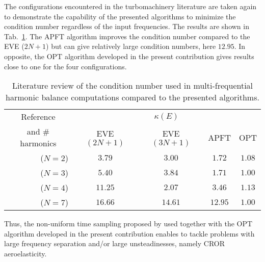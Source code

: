 The configurations encountered in the turbomachinery literature 
are taken again to demonstrate the capability of the presented
algorithms to minimize the condition number
regardless of the input frequencies. The results are shown in 
Tab.~\ref{tab:literature_multistage2}.
The APFT algorithm improves the condition number compared to the
EVE ($2N+1$) but can give relatively large condition numbers, here $12.95$. 
In opposite, the OPT algorithm developed in the
present contribution gives results close to one for the four configurations.
\begin{table}[htp]
   \centering
  \begin{tabular}{rcccc}
    \toprule
    \multicolumn{1}{c}{Reference} & \multicolumn{4}{c}{$\kappa(E)$} \\
    \multicolumn{1}{c}{and \# harmonics} & EVE $(2N+1)$ & EVE $(3N+1)$ & APFT & OPT \\
    \midrule
    \citet{Gopinath2007} ($N=2$) & $\mathbf{3.79}$ & $3.00$ & $1.72$ & $1.08$ \\
    \citet{Ekici2007} ($N=3$) & $5.40$ & $\mathbf{3.84}$ & $1.71$ & $1.00$ \\
    \citet{Gopinath2007} ($N=4$) & $\mathbf{11.25}$ & $2.07$ & $3.46$ & $1.13$ \\
    \citet{Gopinath2007} ($N=7$) & $\mathbf{16.66}$ & $14.61$ & $12.95$ & $1.00$ \\
    \bottomrule
  \end{tabular}
  \caption{Literature review of the condition number used in multi-frequential
  harmonic balance computations compared to the presented algorithms.}
  \label{tab:literature_multistage2}
\end{table}


Thus, the non-uniform time sampling proposed by \citet{ThesisGuedeney}
used together with the OPT algorithm developed in the present contribution
enables to tackle problems with large frequency separation and/or large unsteadinesses,
namely CROR aeroelasticity.

